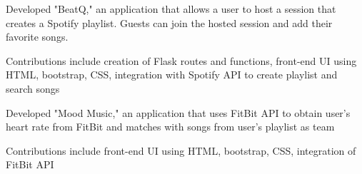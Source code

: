 \documentclass[]{deedy-resume-openfont}
\begin{document}
\begin{minipage}[t]{0.67\textwidth}
\begin{tightemize}
\item Developed "BeatQ," an application that allows a user to host a session that  creates a Spotify playlist. Guests can join the hosted session and add their favorite songs.
\item Contributions include creation of Flask routes and functions, front-end UI using HTML, bootstrap, CSS, integration with Spotify API to create playlist and search songs
\end{tightemize}
\sectionsep

\descript{}
\begin{tightemize}
\item Developed "Mood Music," an application that uses FitBit API to obtain user's heart rate from FitBit and matches with songs from user's playlist as team
\item Contributions include front-end UI using HTML, bootstrap, CSS, integration of FitBit API
\end{tightemize}
\sectionsep

\end{minipage} 
\end{document}
